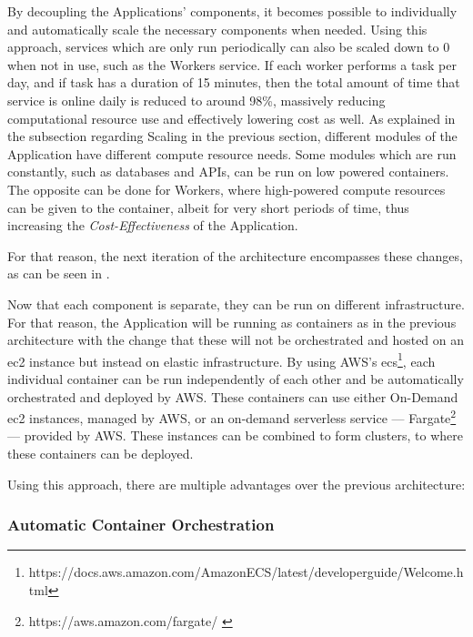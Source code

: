By decoupling the Applications' components, it becomes possible to individually and automatically scale the necessary components when needed. Using this approach, services which are only run periodically can also be scaled down to 0 when not in use, such as the Workers service. If each worker performs a task per day, and if task has a duration of 15 minutes, then the total amount of time that service is online daily is reduced to around 98\%, massively reducing computational resource use and effectively lowering cost as well. As explained in the subsection regarding Scaling in the previous section, different modules of the Application have different compute resource needs. Some modules which are run constantly, such as databases and APIs, can be run on low powered containers. The opposite can be done for Workers, where high-powered compute resources can be given to the container, albeit for very short periods of time, thus increasing the \textit{Cost-Effectiveness} of the Application.


 


For that reason, the next iteration of the architecture encompasses these changes, as can be seen in .

Now that each component is separate, they can be run on different infrastructure. For that reason, the Application will be running as containers as in the previous architecture with the change that these will not be orchestrated and hosted on an \gls{ec2} instance but instead on elastic infrastructure. By using AWS's \gls{ecs}\footnote{https://docs.aws.amazon.com/AmazonECS/latest/developerguide/Welcome.html\label{foot:aws-ecs}}, each individual container can be run independently of each other and be automatically orchestrated and deployed by AWS. These containers can use either On-Demand \gls{ec2} instances, managed by AWS, or an on-demand serverless service --- Fargate\footnote{https://aws.amazon.com/fargate/ \label{foot:fargate}} --- provided by AWS. These instances can be combined to form clusters, to where these containers can be deployed. 

Using this approach, there are multiple advantages over the previous architecture:

\subsubsection{Automatic Container Orchestration}\label{methodology:sss:automatic-container-orchestration}

